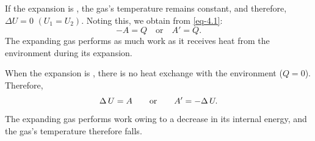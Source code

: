 If the expansion is , the gas's temperature remains constant, and therefore, $\Delta U = 0 \,\, (U_{1} = U_{2})$. Noting this, we obtain from \eqref{eq-4.1}:
\begin{equation}%
- A = Q \quad \textrm{or} \quad A' = Q.
\label{eq-4.2}
\end{equation}
The expanding gas performs as much work as it receives heat from the environment during its expansion.

When the expansion is , there is no heat exchange with the environment ($Q = 0$). Therefore,
\begin{equation}%
\Delta \, U = A \quad \qor \quad A' = - \Delta \, U.
\label{eq-4.3}
\end{equation}
The expanding gas performs work owing to a decrease in its internal energy, and the gas's temperature therefore falls.

